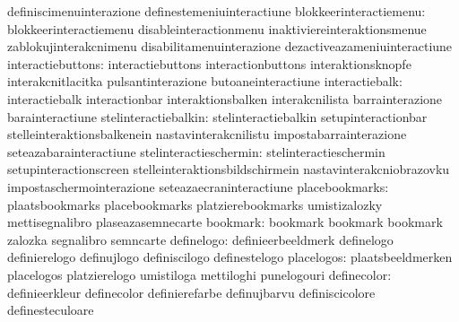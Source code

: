                                   definiscimenuinterazione         definestemeniuinteractiune
          blokkeerinteractiemenu: blokkeerinteractiemenu           disableinteractionmenu
                                  inaktiviereinteraktionsmenue     zablokujinterakcnimenu
                                  disabilitamenuinterazione        dezactiveazameniuinteractiune
               interactiebuttons: interactiebuttons                interactionbuttons
                                  interaktionsknopfe               interakcnitlacitka
                                  pulsantinterazione               butoaneinteractiune
                  interactiebalk: interactiebalk                   interactionbar
                                  interaktionsbalken               interakcnilista
                                  barrainterazione                 barainteractiune
            stelinteractiebalkin: stelinteractiebalkin             setupinteractionbar
                                  stelleinteraktionsbalkenein      nastavinterakcnilistu
                                  impostabarrainterazione          seteazabarainteractiune
          stelinteractieschermin: stelinteractieschermin           setupinteractionscreen
                                  stelleinteraktionsbildschirmein  nastavinterakcniobrazovku
                                  impostaschermointerazione        seteazaecraninteractiune
                  placebookmarks: plaatsbookmarks                  placebookmarks
                                  platzierebookmarks               umistizalozky
                                  mettisegnalibro                  plaseazasemnecarte
                        bookmark: bookmark                         bookmark
                                  bookmark                         zalozka
                                  segnalibro                       semncarte
                      definelogo: definieerbeeldmerk               definelogo
                                  definierelogo                    definujlogo
                                  definiscilogo                    definestelogo
                      placelogos: plaatsbeeldmerken                placelogos
                                  platzierelogo                    umistiloga
                                  mettiloghi                       punelogouri
                    definecolor:  definieerkleur                   definecolor
                                  definierefarbe                   definujbarvu
                                  definiscicolore                  definesteculoare
